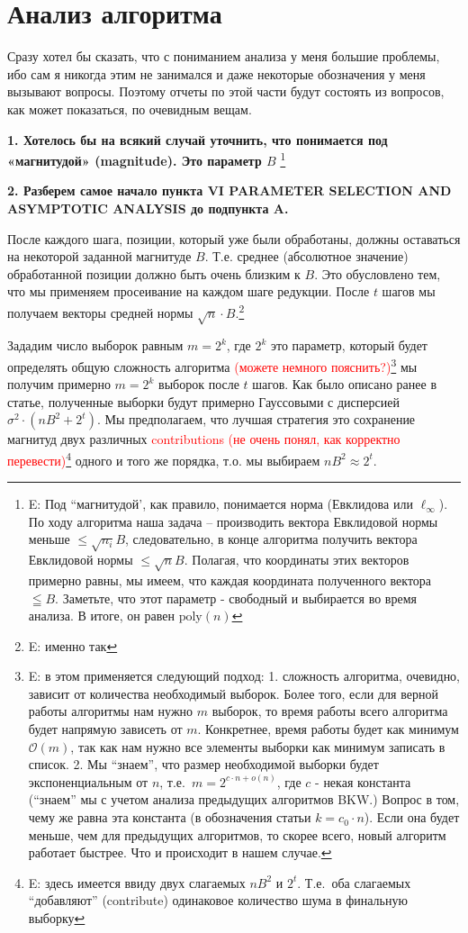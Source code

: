 \documentclass[a4paper,11pt]{article}
\newcommand{\bigO}{\mathcal{O}}
\newcommand{\smallo}{o} %
\newcommand*{\poly}{\ensuremath{\mathrm{poly}}}
\begin{document}
\section{Анализ алгоритма}

Сразу хотел бы сказать, что с пониманием анализа у меня большие проблемы, ибо сам я никогда этим не занимался и даже некоторые обозначения у меня вызывают вопросы. Поэтому отчеты по этой части будут состоять из вопросов, как может показаться, по очевидным вещам.

\textbf{1. Хотелось бы на всякий случай уточнить, что понимается под «магнитудой» (magnitude). Это параметр $B$ } \footnote{E: 
Под ``магнитудой', как правило, понимается норма (Евклидова или $\ell_\infty$). По ходу алгоритма наша задача -- производить вектора  Евклидовой нормы меньше $\leq \sqrt{n_i}B$, следовательно, в конце алгоритма получить вектора Евклидовой нормы $ \leq \sqrt{n}B$. Полагая, что координаты этих векторов примерно равны, мы имеем, что каждая координата полученного вектора $\leqq B$. Заметьте, что этот параметр - свободный и выбирается во время анализа. В итоге, он равен $\poly(n)$
} 

\textbf{2. Разберем самое начало пункта VI PARAMETER SELECTION AND ASYMPTOTIC ANALYSIS до подпункта A.}

После каждого шага, позиции, который уже были обработаны, должны оставаться на некоторой заданной магнитуде $B$. Т.е. среднее (абсолютное значение) обработанной позиции должно быть очень близким к $B$. Это обусловлено тем, что мы применяем просеивание на каждом шаге редукции. После $t$ шагов мы получаем векторы средней нормы $\sqrt{n}\cdot B$.\footnote{E: именно так} 

Зададим число выборок равным ${m=2^k}$, где $2^k$ это параметр, который будет определять общую сложность алгоритма \textcolor{red}{(можете немного пояснить?)}\footnote{E: в этом применяется следующий подход: 1. сложность алгоритма, очевидно, зависит от количества необходимый выборок. Более того, если для верной работы алгоритмы нам нужно $m$ выборок, то время работы всего алгоритма будет напрямую зависеть от $m$. Конкретнее, время работы будет как минимум $\bigO(m)$, так как нам нужно все элементы выборки как минимум записать в список. 2. Мы ``знаем'', что размер необходимой выборки  будет экспоненциальным от $n$, т.е.\ $m = 2^{c \cdot n + \smallo(n) }$, где $c$ - некая константа (``знаем'' мы с учетом анализа предыдущих алгоритмов BKW.) Вопрос в том, чему же равна эта константа (в обозначения статьи $k=c_0 \cdot n$). Если она будет меньше, чем для предыдущих алгоритмов, то скорее всего, новый алгоритм работает быстрее. Что и происходит в нашем случае.}
мы получим примерно $m=2^k$ выборок после $t$ шагов. Как было описано ранее в статье, полученные выборки будут примерно Гауссовыми с дисперсией $\sigma^2\cdot(nB^2+2^t)$. Мы предполагаем, что лучшая стратегия это сохранение магнитуд двух различных \textcolor{red}{contributions (не очень понял, как корректно перевести)}\footnote{E: здесь имеется ввиду двух слагаемых $nB^2$ и $2^t$. Т.е.\ оба слагаемых ``добавляют'' (contribute) одинаковое количество шума в финальную выборку} одного и того же порядка, т.о. мы выбираем $nB^2 \approx 2^t$.
\end{document}
